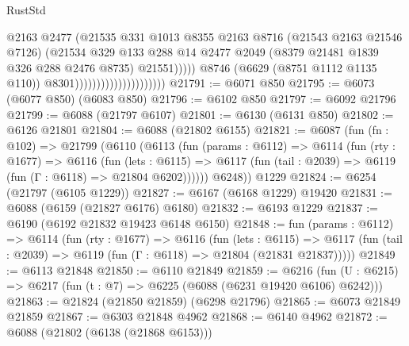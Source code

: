 \begin{lexlean}{RustStd}
\begin{coremodule}
                                                    @2163
                                                    @2477
                                                    (@21535
                                                      @331
                                                      @1013
                                                      @8355
                                                      @2163
                                                      @8716
                                                      (@21543 @2163 @21546 @7126)
                                                      (@21534
                                                        @329
                                                        @133
                                                        @288
                                                        @14
                                                        @2477
                                                        @2049
                                                        (@8379 @21481 @1839 @326 @288 @2476 @8735)
                                                        @21551)))))
                                              @8746
                                              (@6629 (@8751 @1112 @1135 @110))
                                              @8301)))))))))))))))))))))
@21791 := @6071 @850
@21795 := @6073 (@6077 @850) (@6083 @850)
@21796 := @6102 @850
@21797 := @6092 @21796
@21799 := @6088 (@21797 @6107)
@21801 := @6130 (@6131 @850)
@21802 := @6126 @21801
@21804 := @6088 (@21802 @6155)
@21821 := @6087
    (fun (fn : @102) =>
    @21799
      (@6110
        (@6113
          (fun (params : @6112) =>
          @6114
            (fun (rty : @1677) =>
            @6116
              (fun (lets : @6115) =>
              @6117 (fun (tail : @2039) => @6119 (fun (Γ : @6118) => @21804 @6202))))))
        @6248))
    @1229
@21824 := @6254 (@21797 (@6105 @1229))
@21827 := @6167 (@6168 @1229) @19420
@21831 := @6088 (@6159 (@21827 @6176) @6180)
@21832 := @6193 @1229
@21837 := @6190 (@6192 @21832 @19423 @6148 @6150)
@21848 := fun (params : @6112) =>
  @6114
    (fun (rty : @1677) =>
    @6116
      (fun (lets : @6115) =>
      @6117 (fun (tail : @2039) => @6119 (fun (Γ : @6118) => @21804 (@21831 @21837)))))
@21849 := @6113 @21848
@21850 := @6110 @21849
@21859 := @6216
    (fun (U : @6215) => @6217 (fun (t : @7) => @6225 (@6088 (@6231 @19420 @6106) @6242)))
@21863 := @21824 (@21850 @21859) (@6298 @21796)
@21865 := @6073 @21849 @21859
@21867 := @6303 @21848 @4962
@21868 := @6140 @4962
@21872 := @6088 (@21802 (@6138 (@21868 @6153)))

\end{coremodule}
\end{lexlean}
